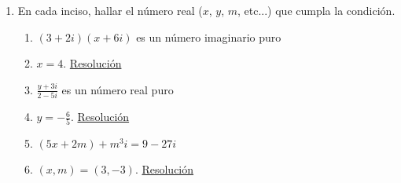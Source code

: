 \documentclass[a4paper]{article}
\newcommand{\answer}{\item[**]}
\newcommand{\exercise}{\item}
\newcommand{\df}[2]{\displaystyle\frac{#1}{#2}}
\newcommand{\conj}[1]{\overline{#1}}
\begin{document}
\begin{enumerate}
\begin{multicols}{2}
\begin{enumerate} [label=(\alph*)]
		\item $\conj{i.z}=-i.\conj{z}$
		\answer Desarrollando el lado izquierdo se obtiene $\conj{i.z}=\conj{i(a+bi)}=\conj{ai+bi^2}=\conj{-b+ai}=-b-ai$. Desarrollando el lado derecho se obtiene $-i.\conj{z}=-i(a-bi)=-ai+bi^2=-b-ai$, que es lo mismo.

		\item $z.\conj{z}=|z|^2$
		\answer Por el lado izquierdo tenemos: $z.\conj{z}=(a+bi)(a-bi)=a^2-(bi)^2=a^2-b^2 i^2=a^2+b^2$. Por el lado derecho tenemos $|z|^2=\sqrt{a^2+b^2}^2=a^2+b^2$. Por lo tanto, son iguales.

		\item $\conj{z-w}=\conj{z}-\conj{w}$
		\item $|z.(1+2i)|^2=|z|^2.|1+2i|^2$
		\item $z+\conj{z} \in \mathbb{R}$
		\item $z-\conj{z} \not\in \mathbb{R}$

		\item $|z-w|=d(z,w)$
		\answer Geometricamente la distancia entre le punto de $z$ y el de $w$ se puede calcular por Teorema de Pitágoras y da $d(z,w)=\sqrt{(a-c)^2+(b-d)^2}$. Si calculamos $z-w=(a-c)+(b-d)i$ podemos ver que su módulo es $|z-w|=\sqrt{(a-c)^2+(b-d)^2}$, que es lo mismo.

		\item $(z-\conj{z})^2=-4Im(z)^2$

	\end{enumerate}
	\end{multicols}

	\exercise En cada inciso, hallar el número real ($x$, $y$, $m$, etc...) que cumpla la condición.
	\begin{enumerate} [label=(\alph*)]
		
		\item $(3+2i)(x+6i)$ es un número imaginario puro
		\answer $x=4$. \href{https://youtu.be/rZMja-gZ3q0}{Resolución}

		\item $\df{y+3i}{2-5i}$ es un número real puro
		\answer $y=-\df{6}{5}$. \href{https://youtu.be/cgQsvNewGZ0}{Resolución}

		\item $(5x+2m)+m^3i = 9-27i$
		\answer $(x,m)=(3,-3)$. \href{https://youtu.be/kQmzdYU4EsY}{Resolución}


\end{enumerate}
\end{enumerate}
\end{document}
